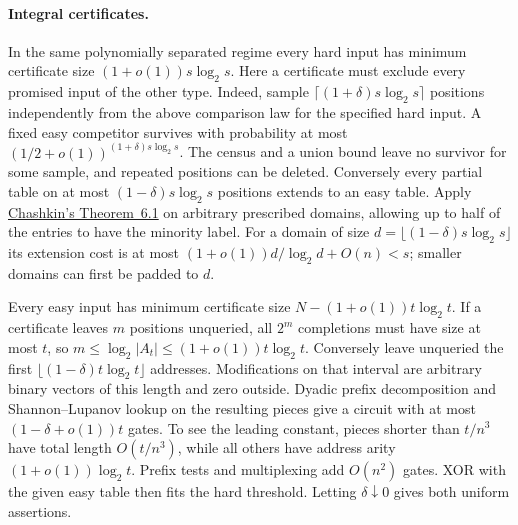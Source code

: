 \paragraph{Integral certificates.}
In the same polynomially separated regime every hard input has minimum certificate size \((1+o(1))s\log_2s\). Here a certificate must exclude every promised input of the other type. Indeed, sample \(\lceil(1+\delta)s\log_2s\rceil\) positions independently from the above comparison law for the specified hard input. A fixed easy competitor survives with probability at most \((1/2+o(1))^{(1+\delta)s\log_2s}\). The census and a union bound leave no survivor for some sample, and repeated positions can be deleted. Conversely every partial table on at most \((1-\delta)s\log_2s\) positions extends to an easy table. Apply \href{https://keldysh.ru/papers/2024/mvk/mvk2024_152.pdf}{Chashkin's Theorem~6.1} on arbitrary prescribed domains, allowing up to half of the entries to have the minority label. For a domain of size \(d=\lfloor(1-\delta)s\log_2s\rfloor\) its extension cost is at most \((1+o(1))d/\log_2d+O(n)<s\); smaller domains can first be padded to \(d\).

Every easy input has minimum certificate size \(N-(1+o(1))t\log_2t\). If a certificate leaves \(m\) positions unqueried, all \(2^m\) completions must have size at most \(t\), so \(m\le\log_2|A_t|\le(1+o(1))t\log_2t\). Conversely leave unqueried the first \(\lfloor(1-\delta)t\log_2t\rfloor\) addresses. Modifications on that interval are arbitrary binary vectors of this length and zero outside. Dyadic prefix decomposition and Shannon--Lupanov lookup on the resulting pieces give a circuit with at most \((1-\delta+o(1))t\) gates. To see the leading constant, pieces shorter than \(t/n^3\) have total length \(O(t/n^3)\), while all others have address arity \((1+o(1))\log_2t\). Prefix tests and multiplexing add \(O(n^2)\) gates. XOR with the given easy table then fits the hard threshold. Letting \(\delta\downarrow0\) gives both uniform assertions.
